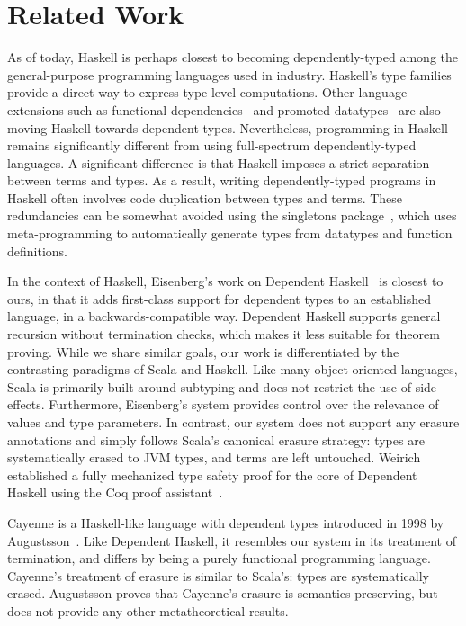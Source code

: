 \section{Related Work}

As of today, Haskell is perhaps closest to becoming dependently-typed among the general-purpose programming languages used in industry.
Haskell's type families~\citep{kiselyov2010fun} provide a direct way to express type-level computations.
Other language extensions such as functional dependencies~\citep{jones2000type} and promoted datatypes~\citep{yorgey2012giving} are also moving Haskell towards dependent types.
Nevertheless, programming in Haskell remains significantly different from using full-spectrum dependently-typed languages.
A significant difference is that Haskell imposes a strict separation between terms and types.
As a result, writing dependently-typed programs in Haskell often involves code duplication between types and terms.
These redundancies can be somewhat avoided using the singletons package~\citep{eisenberg2012dependently}, which uses meta-programming to automatically generate types from datatypes and function definitions.

In the context of Haskell, Eisenberg's work on Dependent Haskell~\citep{eisenberg2016dependent} is closest to ours, in that it adds first-class support for dependent types to an established language, in a backwards-compatible way.
Dependent Haskell supports general recursion without termination checks, which makes it less suitable for theorem proving.
While we share similar goals, our work is differentiated by the contrasting paradigms of Scala and Haskell.
Like many object-oriented languages, Scala is primarily built around subtyping and does not restrict the use of side effects.
Furthermore, Eisenberg's system provides control over the relevance of values and type parameters.
In contrast, our system does not support any erasure annotations and simply follows Scala's canonical erasure strategy: types are systematically erased to JVM types, and terms are left untouched.
Weirich established a fully mechanized type safety proof for the core of Dependent Haskell using the Coq proof assistant~\citep{weirich2017a}.

Cayenne is a Haskell-like language with dependent types introduced in 1998 by Augustsson~\citep{augustsson1998cayenne}.
Like Dependent Haskell, it resembles our system in its treatment of termination, and differs by being a purely functional programming language.
Cayenne's treatment of erasure is similar to Scala's: types are systematically erased.
Augustsson proves that Cayenne's erasure is semantics-preserving, but does not provide any other metatheoretical results.

